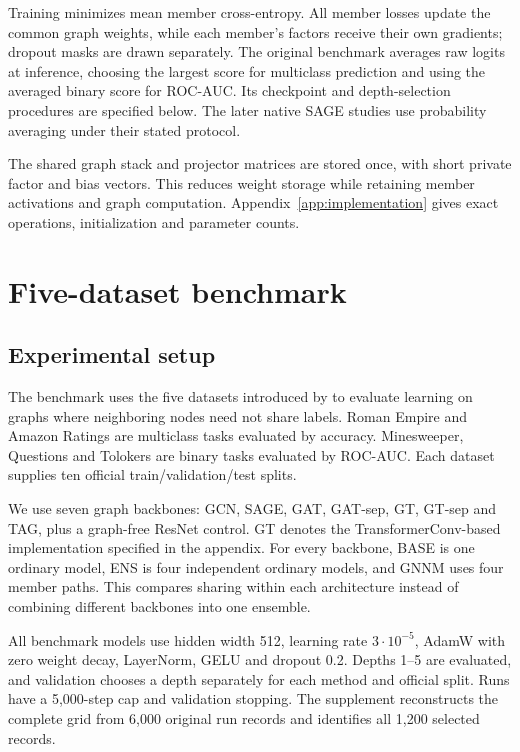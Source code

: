 \documentclass{article}
\begin{document}
Training minimizes mean member cross-entropy. All member losses update the common graph weights, while each member's factors receive their own gradients; dropout masks are drawn separately. The original benchmark averages raw logits at inference, choosing the largest score for multiclass prediction and using the averaged binary score for ROC-AUC. Its checkpoint and depth-selection procedures are specified below. The later native SAGE studies use probability averaging under their stated protocol.

The shared graph stack and projector matrices are stored once, with short private factor and bias vectors. This reduces weight storage while retaining member activations and graph computation. Appendix~\ref{app:implementation} gives exact operations, initialization and parameter counts.

\section{Five-dataset benchmark}\label{sec:original-benchmark}
\subsection{Experimental setup}
The benchmark uses the five datasets introduced by \citet{platonov2023critical} to evaluate learning on graphs where neighboring nodes need not share labels. Roman Empire and Amazon Ratings are multiclass tasks evaluated by accuracy. Minesweeper, Questions and Tolokers are binary tasks evaluated by ROC-AUC. Each dataset supplies ten official train/validation/test splits.

We use seven graph backbones: GCN, SAGE, GAT, GAT-sep, GT, GT-sep and TAG, plus a graph-free ResNet control. GT denotes the TransformerConv-based implementation specified in the appendix. For every backbone, BASE is one ordinary model, ENS is four independent ordinary models, and GNNM uses four member paths. This compares sharing within each architecture instead of combining different backbones into one ensemble.

All benchmark models use hidden width 512, learning rate $3\cdot10^{-5}$, AdamW with zero weight decay, LayerNorm, GELU and dropout 0.2. Depths 1--5 are evaluated, and validation chooses a depth separately for each method and official split. Runs have a 5,000-step cap and validation stopping. The supplement reconstructs the complete grid from 6,000 original run records and identifies all 1,200 selected records.
\end{document}
